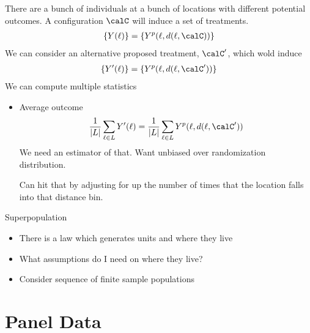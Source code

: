 \documentclass[12pt]{article}
\theoremstyle{plain}
\theoremstyle{definition}
\theoremstyle{remark}
\begin{document}
\clearpage
There are a bunch of individuals at a bunch of locations with different
potential outcomes.
A configuration $\calC$ will induce a set of treatments.
\begin{align*}
  \{Y(\ell)\}
  =
  \{Y^p(\ell,d(\ell,\calC))\}
\end{align*}
We can consider an alternative proposed treatment, $\calC'$, which wold
induce
\begin{align*}
  \{Y'(\ell)\}
  =
  \{Y^p(\ell,d(\ell,\calC'))\}
\end{align*}
We can compute multiple statistics
\begin{itemize}
  \item Average outcome
    \begin{align*}
      \frac{1}{|L|}
      \sum_{\ell\in L}
      Y'(\ell)
      =
      \frac{1}{|L|}
      \sum_{\ell\in L}
      Y^p(\ell,d(\ell,\calC'))
    \end{align*}
    We need an estimator of that.
    Want unbiased over randomization distribution.

    Can hit that by adjusting for up the number of times that the
    location falls into that distance bin.
\end{itemize}
Superpopulation
\begin{itemize}
  \item There is a law which generates units and where they live
  \item What assumptions do I need on where they live?
  \item Consider sequence of finite sample populations
\end{itemize}










\clearpage
\section{Panel Data}
\end{document}
